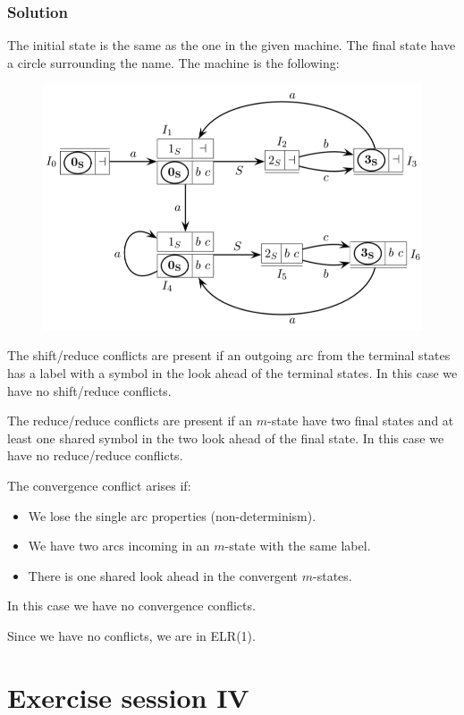 \documentclass[12pt, a4paper]{report}
\newtheorem[style=M,bodystyle=\normalfont]{theorem}{Theorem}
\newtheorem[style=M,bodystyle=\normalfont]{corollary}{Corollary}
\newtheorem[style=M,bodystyle=\normalfont]{lemma}{Lemma}
\newtheorem[style=M,bodystyle=\normalfont]{definition}{Definition}
\begin{document}
    \subsection*{Solution}
    The initial state is the same as the one in the given machine. The final state have a circle surrounding the name. The machine is the following: 
    \begin{figure}[H]
        \centering
        \includegraphics[width=0.6\linewidth]{images/pilot.png}
    \end{figure} 
    The shift/reduce conflicts are present if an outgoing arc from the terminal states has a label with a symbol in the look ahead of the terminal states. 
    In this case we have no shift/reduce conflicts. 

    The reduce/reduce conflicts are present if an $m$-state have two final states and at least one shared symbol in the two look ahead of the final state. 
    In this case we have no reduce/reduce conflicts. 

    The convergence conflict arises if: 
    \begin{itemize}
        \item We lose the single arc properties (non-determinism). 
        \item We have two arcs incoming in an $m$-state with the same label. 
        \item There is one shared look ahead in the convergent $m$-states. 
    \end{itemize}
    In this case we have no convergence conflicts. 

    Since we have no conflicts, we are in ELR(1). 
\newpage 

\chapter{Exercise session IV}
\end{document}
